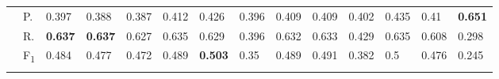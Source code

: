 \begin{tabularx}{\hsize}{p{1.3em}l Z  Z  Z  Z  Z  Z  Z  Z  Z  Z  Z  Z }
    & P.    & 0.397    & 0.388    & 0.387    & 0.412    & 0.426    & 0.396    & 0.409    & 0.409    & 0.402    & 0.435    & 0.41    & \textbf{ 0.651 } \\
    & R.    & \textbf{ 0.637 }    & \textbf{ 0.637 }    & 0.627    & 0.635    & 0.629    & 0.396    & 0.632    & 0.633    & 0.429    & 0.635    & 0.608    & 0.298 \\
    & F\textsubscript{1}    & 0.484    & 0.477    & 0.472    & 0.489    & \textbf{ 0.503 }    & 0.35    & 0.489    & 0.491    & 0.382    & 0.5    & 0.476    & 0.245 \\
     \midrule {}

\end{tabularx}